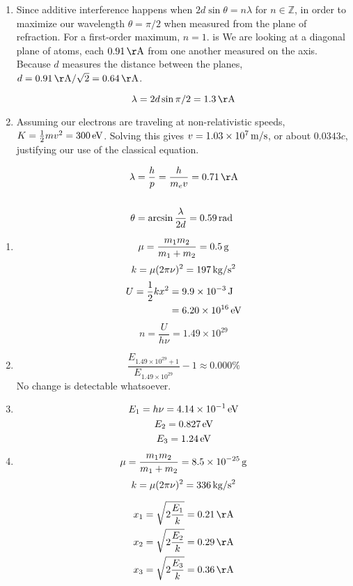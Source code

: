 \documentclass[12pt]{article}
\begin{document}
\problem %
\begin{enumerate}[label=\alph{*})]
\item Since additive interference happens when $2d\sin{\theta} = n\lambda$ for $n \in \mathbb{Z}$, in order to maximize our wavelength $\theta = \pi/2$ when measured from the plane of refraction. For a first-order maximum, $n = 1$.
is
We are looking at a diagonal plane of atoms, each $\unit[0.91]{\AA}$ from one another measured on the axis. Because $d$ measures the distance between the planes, $d = \unit[0.91]{\AA}/\sqrt{2} = \unit[0.64]{\AA}$.

$$
\lambda =  2d\sin{\pi/2} = \unit[1.3]{\AA}
$$

\newpage
\item Assuming our electrons are traveling at non-relativistic speeds, $K = \frac{1}{2}mv^2 = \unit[300]{eV}$. Solving this gives $v = \unit[1.03\times10^7]{m/s}$, or about $0.0343c$, justifying our use of the classical equation.

\begin{align*}
\lambda &= \frac{h}{p} = \frac{h}{m_ev} = \unit[0.71]{\AA} \\
\\
\theta &= \arcsin{\frac{\lambda}{2d}} = \unit[0.59]{rad}
\end{align*}
\end{enumerate}
 
\problem %
\begin{enumerate}[label=\alph{*})]
\item 
$$\mu = \frac{m_1m_2}{m_1+m_2} = \unit[0.5]{g}$$
$$k = \mu(2\pi\nu)^2 = \unit[197]{kg/s^2}$$
\begin{align*}
U = \frac{1}{2}kx^2 &= \unit[9.9\times 10^{-3}]{J} \\ 
&= \unit[6.20\times10^{16}]{eV}
\end{align*}
$$n = \frac{U}{h\nu} = 1.49\times10^{29}$$

\item $$\frac{E_{1.49\times10^{29}+1}}{E_{1.49\times10^{29}}} - 1 \approx 0.000\%$$
No change is detectable whatsoever.

\item $$E_1 = h\nu= \unit[4.14\times10^{-1}]{eV}$$
$$E_2 = \unit[0.827]{eV}$$
$$E_3 = \unit[1.24]{eV}$$

\newpage
\item
$$\mu = \frac{m_1m_2}{m_1+m_2} = \unit[8.5\times10^{-25}]{g}$$
$$k = \mu(2\pi\nu)^2 = \unit[336]{kg/s^2}$$

\begin{align*}
x_1 = \sqrt{2 \frac{E_1}{k}} &= \unit[0.21]{\AA} \\
x_2 = \sqrt{2 \frac{E_2}{k}} &= \unit[0.29]{\AA} \\
x_3 = \sqrt{2 \frac{E_3}{k}} &= \unit[0.36]{\AA} \\
\end{align*}
\end{enumerate}
\end{document}
